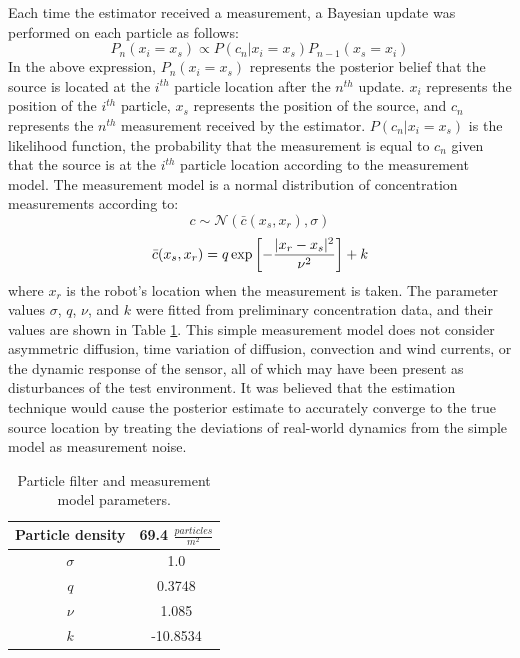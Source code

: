\documentclass[submit, 12pt]{aiaa-pretty-modified}
\begin{document}
Each time the estimator received a
measurement, a Bayesian update was performed on each particle
as follows: 
\[P_n(x_i = x_s) \propto P(c_n | x_i = x_s) P_{n-1}(x_s = x_i)\]
In the above expression, $P_n(x_i = x_s)$ represents the posterior belief that the source is located at the
$i^{th}$ particle location after the $n^{th}$ update.  $x_i$
represents the position of the $i^{th}$ particle, $x_s$ represents the
position of the source, and $c_n$ represents
the $n^{th}$ measurement received by the estimator. $P(c_n | x_i =
x_s)$ is the likelihood function, the probability that the measurement
is equal to $c_n$ given that the source is at the $i^{th}$ particle location according to
the measurement model. The measurement model is a normal
distribution of concentration
measurements according to: 
\[c \sim \mathcal{N}\left(\bar{c}(x_s,x_r), \sigma \right)\]
\[\bar{c}(x_s,x_r) = q \exp{\left[-\frac{\lvert x_r - x_s\rvert^2}{\nu^2}\right]} + k\]
where $x_r$ is the robot's location when the measurement is taken. The parameter
values $\sigma$, $q$, $\nu$, and $k$ were fitted from preliminary
concentration data, and their values are shown in Table
\ref{tab:estimator-parameters}.  This simple measurement model does
not consider asymmetric
diffusion, time variation of diffusion, convection and wind currents, or the dynamic response of the
sensor, all of which may have been present as disturbances of the test environment. It was believed that the estimation technique would
cause the posterior estimate to accurately converge to the true source location by
treating the deviations of real-world
dynamics from the simple model as measurement noise.

\begin{table}
\caption[Estimator parameters]{Particle filter and measurement model parameters.}
\begin{center}
\begin{tabular}{|c|c|}
\hline
Particle density & 69.4 $\frac{particles}{m^2}$ \\ \hline
$\sigma$ & 1.0 \\ \hline
$q$ & 0.3748 \\ \hline
$\nu$ & 1.085  \\ \hline
$k$ & -10.8534  \\ \hline
\end{tabular}
\end{center}
\label{tab:estimator-parameters}
\end{table}
\end{document}
